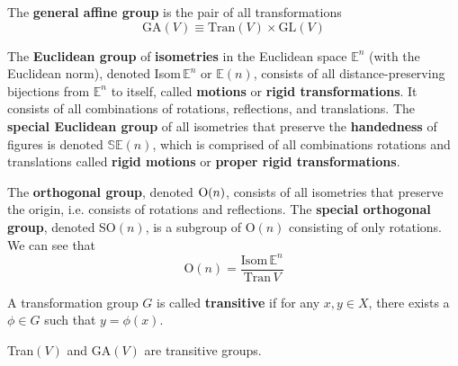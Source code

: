   \begin{definition}
    The \textbf{general affine group} is the pair of all transformations
    \begin{equation}
      \text{GA} (V) \equiv \text{Tran}(V) \times \text{GL}(V)
    \end{equation}
  \end{definition}

  \begin{definition}[Isometries]
    The \textbf{Euclidean group} of \textbf{isometries} in the Euclidean space $\mathbb{E}^{n}$ (with the Euclidean norm), denoted Isom$\, \mathbb{E}^{n}$ or $\mathbb{E}(n)$, consists of all distance-preserving bijections from $\mathbb{E}^{n}$ to itself, called \textbf{motions} or \textbf{rigid transformations}. It consists of all combinations of rotations, reflections, and translations. The \textbf{special Euclidean group} of all isometries that preserve the \textbf{handedness} of figures is denoted $\mathbb{SE}(n)$, which is comprised of all combinations rotations and translations called \textbf{rigid motions} or \textbf{proper rigid transformations}.
  \end{definition}

  \begin{definition}
    The \textbf{orthogonal group}, denoted $\operatorname{O}(n)$, consists of all isometries that preserve the origin, i.e. consists of rotations and reflections. The \textbf{special orthogonal group}, denoted SO$(n)$, is a subgroup of O$(n)$ consisting of only rotations. We can see that 
    \begin{equation}
      \text{O}(n)=\frac{\text{Isom}\, \mathbb{E}^{n}}{\text{Tran}\,V}
    \end{equation}
  \end{definition}

  \begin{definition}[Transitive]
    A transformation group $G$ is called \textbf{transitive} if for any $x, y \in X$, there exists a $\phi \in G$ such that $y = \phi(x)$. 
  \end{definition}

  \begin{example}
    Tran$(V)$ and GA$(V)$ are transitive groups. 
  \end{example}

